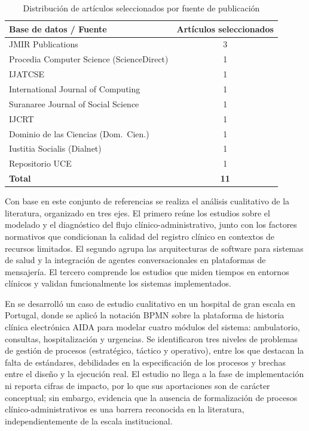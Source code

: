 \begin{table}[H]
\centering
\renewcommand{\arraystretch}{1.3}
\begin{tabular}{|l|c|}
\hline
\textbf{Base de datos / Fuente} & \textbf{Artículos seleccionados} \\
\hline
JMIR Publications                            & 3 \\
\hline
Procedia Computer Science (ScienceDirect)    & 1 \\
\hline
IJATCSE                                      & 1 \\
\hline
International Journal of Computing           & 1 \\
\hline
Suranaree Journal of Social Science          & 1 \\
\hline
IJCRT                                        & 1 \\
\hline
Dominio de las Ciencias (Dom.\ Cien.)        & 1 \\
\hline
Iustitia Socialis (Dialnet)                  & 1 \\
\hline
Repositorio UCE                              & 1 \\
\hline
\textbf{Total}                               & \textbf{11} \\
\hline
\end{tabular}
\caption{Distribución de artículos seleccionados por fuente de publicación}
\label{tab:fuentes-ant}
\end{table}

Con base en este conjunto de referencias se realiza el análisis cualitativo de la
literatura, organizado en tres ejes. El primero reúne los estudios sobre el modelado
y el diagnóstico del flujo clínico-administrativo, junto con los factores normativos
que condicionan la calidad del registro clínico en contextos de recursos limitados. El
segundo agrupa las arquitecturas de software para sistemas de salud y la integración
de agentes conversacionales en plataformas de mensajería. El tercero comprende los
estudios que miden tiempos en entornos clínicos y validan funcionalmente los sistemas
implementados.


En \cite{gomes2018bpm} se desarrolló un caso de estudio cualitativo en un hospital
de gran escala en Portugal, donde se aplicó la notación BPMN sobre la plataforma de
historia clínica electrónica AIDA para modelar cuatro módulos del sistema: ambulatorio,
consultas, hospitalización y urgencias. Se identificaron tres niveles de problemas de
gestión de procesos (estratégico, táctico y operativo), entre los que destacan la falta
de estándares, debilidades en la especificación de los procesos y brechas entre el
diseño y la ejecución real. El estudio no llega a la fase de implementación ni reporta
cifras de impacto, por lo que sus aportaciones son de carácter conceptual; sin embargo,
evidencia que la ausencia de formalización de procesos clínico-administrativos es una
barrera reconocida en la literatura, independientemente de la escala institucional.

